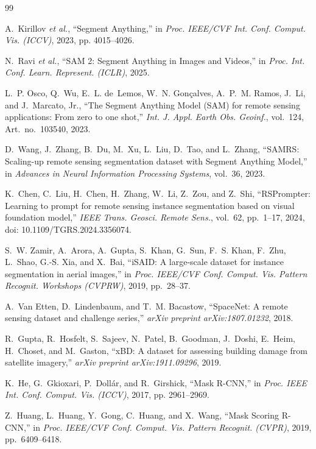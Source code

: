 \documentclass[letterpaper,journal]{IEEEtran}
\begin{document}
\begin{thebibliography}{99}


A.~Kirillov \textit{et al.}, ``Segment Anything,'' in \textit{Proc. IEEE/CVF Int. Conf. Comput. Vis. (ICCV)}, 2023, pp. 4015--4026.

N.~Ravi \textit{et al.}, ``SAM 2: Segment Anything in Images and Videos,'' in \textit{Proc. Int. Conf. Learn. Represent. (ICLR)}, 2025.

L.~P. Osco, Q.~Wu, E.~L. de~Lemos, W.~N. Gon\c{c}alves, A.~P.~M. Ramos, J.~Li, and J.~Marcato, Jr., ``The Segment Anything Model (SAM) for remote sensing applications: From zero to one shot,'' \textit{Int. J. Appl. Earth Obs. Geoinf.}, vol.~124, Art.~no.~103540, 2023.

D.~Wang, J.~Zhang, B.~Du, M.~Xu, L.~Liu, D.~Tao, and L.~Zhang, ``SAMRS: Scaling-up remote sensing segmentation dataset with Segment Anything Model,'' in \textit{Advances in Neural Information Processing Systems}, vol.~36, 2023.

K.~Chen, C.~Liu, H.~Chen, H.~Zhang, W.~Li, Z.~Zou, and Z.~Shi, ``RSPrompter: Learning to prompt for remote sensing instance segmentation based on visual foundation model,'' \textit{IEEE Trans. Geosci. Remote Sens.}, vol.~62, pp.~1--17, 2024, doi: 10.1109/TGRS.2024.3356074.

S.~W. Zamir, A.~Arora, A.~Gupta, S.~Khan, G.~Sun, F.~S. Khan, F.~Zhu, L.~Shao, G.-S. Xia, and X.~Bai, ``iSAID: A large-scale dataset for instance segmentation in aerial images,'' in \textit{Proc. IEEE/CVF Conf. Comput. Vis. Pattern Recognit. Workshops (CVPRW)}, 2019, pp.~28--37.

A.~Van Etten, D.~Lindenbaum, and T.~M. Bacastow, ``SpaceNet: A remote sensing dataset and challenge series,'' \textit{arXiv preprint arXiv:1807.01232}, 2018.

R.~Gupta, R.~Hosfelt, S.~Sajeev, N.~Patel, B.~Goodman, J.~Doshi, E.~Heim, H.~Choset, and M.~Gaston, ``xBD: A dataset for assessing building damage from satellite imagery,'' \textit{arXiv preprint arXiv:1911.09296}, 2019.

K.~He, G.~Gkioxari, P.~Doll\'ar, and R.~Girshick, ``Mask R-CNN,'' in \textit{Proc. IEEE Int. Conf. Comput. Vis. (ICCV)}, 2017, pp. 2961--2969.

Z.~Huang, L.~Huang, Y.~Gong, C.~Huang, and X.~Wang, ``Mask Scoring R-CNN,'' in \textit{Proc. IEEE/CVF Conf. Comput. Vis. Pattern Recognit. (CVPR)}, 2019, pp.~6409--6418.


\end{thebibliography}
\end{document}

